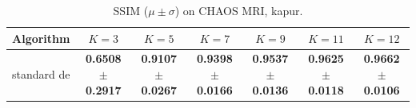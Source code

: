 \begin{table}[htbp]
\centering
\caption{SSIM ($\mu \pm \sigma$) on CHAOS MRI, kapur.}
\label{tab:exp2-kapur-ssim}
\begin{tabular}{lcccccc}
\toprule
Algorithm & $K=3$ & $K=5$ & $K=7$ & $K=9$ & $K=11$ & $K=12$ \\
\midrule
standard de & \textbf{0.6508 $\pm$ 0.2917} & \textbf{0.9107 $\pm$ 0.0267} & \textbf{0.9398 $\pm$ 0.0166} & \textbf{0.9537 $\pm$ 0.0136} & \textbf{0.9625 $\pm$ 0.0118} & \textbf{0.9662 $\pm$ 0.0106} \\
\bottomrule
\end{tabular}
\end{table}